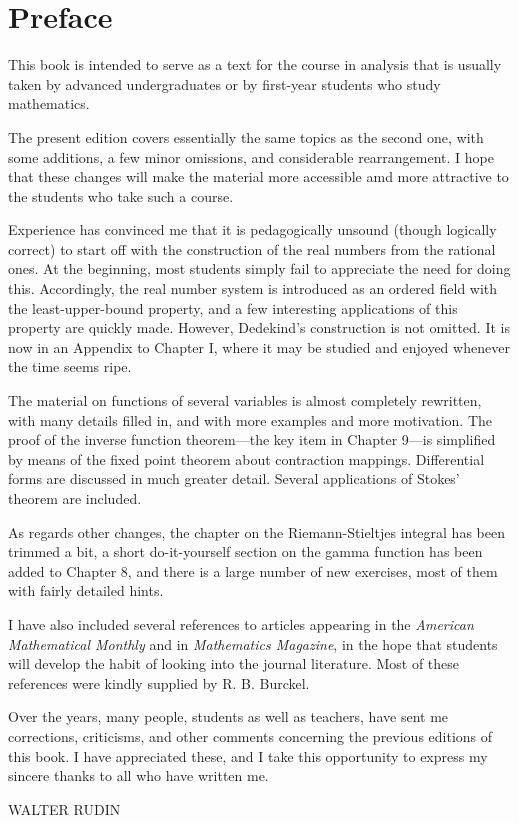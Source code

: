 \chapter*{Preface}

This book is intended to serve as a text for the course in analysis that is usually
taken by advanced undergraduates or by first-year students who study mathematics.

The present edition covers essentially the same topics as the second one,
with some additions, a few minor omissions, and considerable rearrangement. I hope that these changes will make the material more accessible amd more attractive to the students who take such a course.

Experience has convinced me that it is pedagogically unsound (though
logically correct) to start off with the construction of the real numbers from the
rational ones. At the beginning, most students simply fail to appreciate the need
for doing this. Accordingly, the real number system is introduced as an ordered
field with the least-upper-bound property, and a few interesting applications of
this property are quickly made. However, Dedekind's construction is not omitted. It is now in an Appendix to Chapter I, where it may be studied and enjoyed
whenever the time seems ripe.

The material on functions of several variables is almost completely rewritten, with many details filled in, and with more examples and more motivation. The proof of the inverse function theorem---the key item in Chapter 9---is
simplified by means of the fixed point theorem about contraction mappings.
Differential forms are discussed in much greater detail. Several applications of
Stokes' theorem are included.

As regards other changes, the chapter on the Riemann-Stieltjes integral
has been trimmed a bit, a short do-it-yourself section on the gamma function
has been added to Chapter 8, and there is a large number of new exercises, most
of them with fairly detailed hints.

I have also included several references to articles appearing in the \emph{American Mathematical Monthly} and in \emph{Mathematics Magazine}, in the hope that students
will develop the habit of looking into the journal literature. Most of these
references were kindly supplied by R. B. Burckel.

Over the years, many people, students as well as teachers, have sent me
corrections, criticisms, and other comments concerning the previous editions
of this book. I have appreciated these, and I take this opportunity to express
my sincere thanks to all who have written me.


WALTER RUDIN
